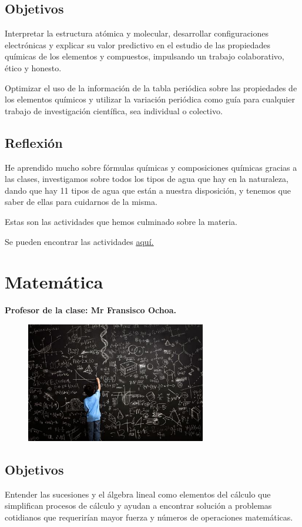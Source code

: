 \documentclass[a4paper, 12pt]{article}
\begin{document}
\subsection{Objetivos}
Interpretar la estructura atómica y molecular, desarrollar configuraciones electrónicas y explicar su valor predictivo en el estudio de las propiedades químicas de los elementos y compuestos, impulsando un trabajo colaborativo, ético y honesto.

Optimizar el uso de la información de la tabla periódica sobre las propiedades de los elementos químicos y utilizar la variación periódica como guía para cualquier trabajo de investigación científica, sea individual o colectivo.

\subsection{Reflexión}
He aprendido mucho sobre fórmulas químicas y composiciones químicas gracias a las clases, investigamos sobre todos los tipos de agua que hay en la naturaleza, dando que hay 11 tipos de agua que están a nuestra disposición, y tenemos que saber de ellas para cuidarnos de la misma.

Estas son las actividades que hemos culminado sobre la materia.

Se pueden encontrar las actividades \href{https://drive.google.com/drive/folders/1sVpbMzXSFN_uNBDNxBb1wdva3F2rRT37?usp=sharing}{\underline{aquí.}}

\section{Matemática}
\textbf{Profesor de la clase: Mr Fransisco Ochoa.}
\begin{figure}[h!]
  \includegraphics[width=0.7\textwidth, center]{math.jpeg}
\end{figure}

\subsection{Objetivos}
Entender las sucesiones y el álgebra lineal como elementos del cálculo que simplifican procesos de cálculo y ayudan a encontrar solución a problemas cotidianos que requerirían mayor fuerza y números de operaciones matemáticas.
\end{document}
